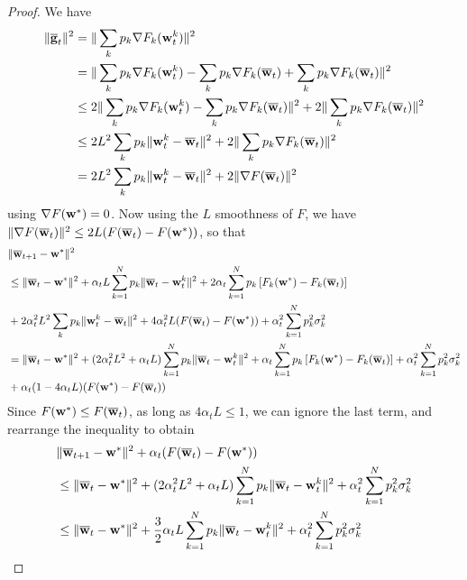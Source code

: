 \begin{proof}
	We have
	\begin{align*}
	\|{\overline{\mathbf{g}}}_{t}\|^{2} & =\|\sum_{k}p_{k}\nabla F_{k}({\mathbf{w}}_{t}^{k})\|^{2}\\
	& =\|\sum_{k}p_{k}\nabla F_{k}({\mathbf{w}}_{t}^{k})-\sum_{k}p_{k}\nabla F_{k}({\overline{\mathbf{w}}}_{t})+\sum_{k}p_{k}\nabla F_{k}({\overline{\mathbf{w}}}_{t})\|^{2}\\
	& \leq2\|\sum_{k}p_{k}\nabla F_{k}({\mathbf{w}}_{t}^{k})-\sum_{k}p_{k}\nabla F_{k}({\overline{\mathbf{w}}}_{t})\|^{2}+2\|\sum_{k}p_{k}\nabla F_{k}({\overline{\mathbf{w}}}_{t})\|^{2}\\
	& \leq2L^{2}\sum_{k}p_{k}\|{\mathbf{w}}_{t}^{k}-{\overline{\mathbf{w}}}_{t}\|^{2}+2\|\sum_{k}p_{k}\nabla F_{k}({\overline{\mathbf{w}}}_{t})\|^{2}\\
	& =2L^{2}\sum_{k}p_{k}\|{\mathbf{w}}_{t}^{k}-{\overline{\mathbf{w}}}_{t}\|^{2}+2\|\nabla F({\overline{\mathbf{w}}}_{t})\|^{2}
	\end{align*}
	using $\nabla F({\mathbf{w}}^{\ast})=0$. Now using the $L$ smoothness of $F$,
	we have $\|\nabla F({\overline{\mathbf{w}}}_{t})\|^{2}\leq2L(F({\overline{\mathbf{w}}}_{t})-F({\mathbf{w}}^{\ast}))$,
	so that 
	\begin{align*}
	& \|{\overline{\mathbf{w}}}_{t+1}-{\mathbf{w}}^{\ast}\|^{2}\\
	& \leq\|{\overline{\mathbf{w}}}_{t}-{\mathbf{w}}^{\ast}\|^{2}+\alpha_{t}L\sum_{k=1}^{N}p_{k}\|{\overline{\mathbf{w}}}_{t}-{\mathbf{w}}_{t}^{k}\|^{2}+2\alpha_{t}\sum_{k=1}^{N}p_{k}\left[F_{k}({\mathbf{w}}^{\ast})-F_{k}({\overline{\mathbf{w}}}_{t})\right]\\
	& +2\alpha_{t}^{2}L^{2}\sum_{k}p_{k}\|{\mathbf{w}}_{t}^{k}-{\overline{\mathbf{w}}}_{t}\|^{2}+4\alpha_{t}^{2}L(F({\overline{\mathbf{w}}}_{t})-F({\mathbf{w}}^{\ast}))+\alpha_{t}^{2}\sum_{k=1}^{N}p_{k}^{2}\sigma_{k}^{2}\\
	& =\|{\overline{\mathbf{w}}}_{t}-{\mathbf{w}}^{\ast}\|^{2}+(2\alpha_{t}^{2}L^{2}+\alpha_{t}L)\sum_{k=1}^{N}p_{k}\|{\overline{\mathbf{w}}}_{t}-{\mathbf{w}}_{t}^{k}\|^{2}+\alpha_{t}\sum_{k=1}^{N}p_{k}\left[F_{k}({\mathbf{w}}^{\ast})-F_{k}({\overline{\mathbf{w}}}_{t})\right]+\alpha_{t}^{2}\sum_{k=1}^{N}p_{k}^{2}\sigma_{k}^{2}\\
	& +\alpha_{t}(1-4\alpha_{t}L)(F({\mathbf{w}}^{\ast})-F({\overline{\mathbf{w}}}_{t}))
	\end{align*}
	Since $F({\mathbf{w}}^{\ast})\leq F({\overline{\mathbf{w}}}_{t})$, as long as $4\alpha_{t}L\leq1$,
	we can ignore the last term, and rearrange the inequality to obtain
	\begin{align*}
	& \|{\overline{\mathbf{w}}}_{t+1}-{\mathbf{w}}^{\ast}\|^{2}+\alpha_{t}(F({\overline{\mathbf{w}}}_{t})-F({\mathbf{w}}^{\ast}))\\
	& \leq\|{\overline{\mathbf{w}}}_{t}-{\mathbf{w}}^{\ast}\|^{2}+(2\alpha_{t}^{2}L^{2}+\alpha_{t}L)\sum_{k=1}^{N}p_{k}\|{\overline{\mathbf{w}}}_{t}-{\mathbf{w}}_{t}^{k}\|^{2}+\alpha_{t}^{2}\sum_{k=1}^{N}p_{k}^{2}\sigma_{k}^{2}\\
	& \leq\|{\overline{\mathbf{w}}}_{t}-{\mathbf{w}}^{\ast}\|^{2}+\frac{3}{2}\alpha_{t}L\sum_{k=1}^{N}p_{k}\|{\overline{\mathbf{w}}}_{t}-{\mathbf{w}}_{t}^{k}\|^{2}+\alpha_{t}^{2}\sum_{k=1}^{N}p_{k}^{2}\sigma_{k}^{2}
	\end{align*}
	

\end{proof}
